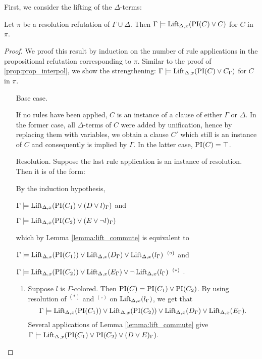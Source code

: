 First, we consider the lifting of the $\Delta$-terms:\nopagebreak[4]

\begin{lemma}
	Let $\pi$ be a resolution refutation of $\Gamma \cup \Delta$. 
	Then $\Gamma \entails \lift{\Delta}{ \PI(C) \lor C }{x} $ for $C$ in $\pi$.
\end{lemma}
\begin{proof}
	We proof this result by induction on the number of rule applications in the propositional refutation corresponding to $\pi$. 
	Similar to the proof of \ref{prop:prop_interpol}, we show the strengthening:
	$\Gamma \entails \lift{\Delta}{ \PI(C) \lor C_\Gamma }{x} $ for $C$ in $\pi$.

	\begin{itemize}
		\item[Base case.]

			If no rules have been applied, $C$ is an instance of a clause of either $\Gamma$ or $\Delta$.
			In the former case, all $\Delta$-terms of $C$ were added by unification, hence by replacing them with variables, we obtain a clause $C'$ which still is an instance of $C$ and consequently is implied by $\Gamma$. 
			In the latter case, $\PI(C) = \top$. 

		\item[Resolution.] Suppose the last rule application is an instance of resolution. Then it is of the form:
			\begin{prooftree}
			\end{prooftree}

						By the induction hypothesis,

						$\Gamma \entails \lift{\Delta}{ \PI(C_1) \lor (D \lor l)_\Gamma }{x}$ and

						$\Gamma \entails \lift{\Delta}{ \PI(C_2) \lor (E \lor \lnot l)_\Gamma }{x}$

						which by Lemma \ref{lemma:lift_commute} is equivalent to

						$\Gamma \entails \lift{\Delta}{ \PI(C_1) }{x} \lor
						\lift{\Delta}{ D_\Gamma }{x} \lor
						\lift{\Delta}{ l_\Gamma }{x} \;\; ^{(\circ)} $
						and

						$\Gamma \entails \lift{\Delta}{ \PI(C_2) }{x} \lor
						\lift{\Delta}{ E_\Gamma }{x} \lor
						\lnot \lift{\Delta}{ l_\Gamma }{x} \;\; ^{(*)}$ .
				

			\begin{enumerate}
					\item Suppose $l$ is $\Gamma$-colored.
						Then $\PI(C) = \PI(C_1) \lor \PI(C_2)$.
						By using resolution of $^{(*)}$ and $^{(\circ)}$ on $\lift{\Delta}{l_\Gamma}{x}$, we get that 
						$$\Gamma \entails\lift{\Delta}{ \PI(C_1) }{x} \lor \lift{\Delta}{ \PI(C_2) }{x} \lor
						\lift{\Delta}{ D_\Gamma }{x} \lor
						\lift{\Delta}{ E_\Gamma }{x}.$$
						Several applications of Lemma \ref{lemma:lift_commute} give
						$\Gamma \entails\lift{\Delta}{ \PI(C_1)  \lor  \PI(C_2) \lor (D \lor E)_\Gamma }{x}$.
				

\end{enumerate}
\end{itemize}
\end{proof}
